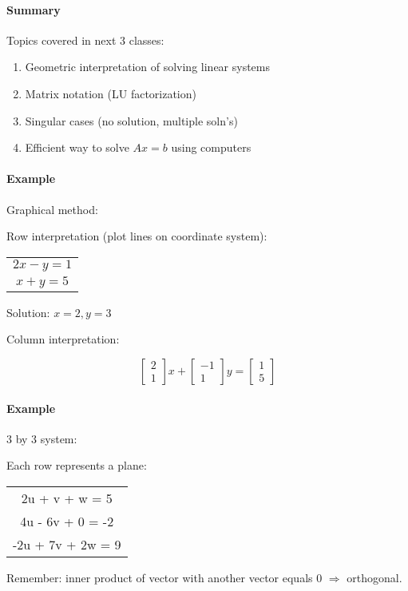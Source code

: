 \documentclass[12pt]{article}
\newcommand{\<}{\langle}
\renewcommand{\>}{\rangle}
\begin{document}
\paragraph{Summary}
Topics covered in next 3 classes:
\begin{enumerate}
	\item Geometric interpretation of solving linear systems
	\item Matrix notation (LU factorization)
	\item Singular cases (no solution, multiple soln's)
	\item Efficient way to solve $Ax=b$ using computers
\end{enumerate}

\paragraph{Example} Graphical method:

Row interpretation (plot lines on coordinate system):

\begin{tabular}{c}
	$2x - y = 1$ \\
	$x + y = 5$
\end{tabular}
Solution: $x=2,y=3$

Column interpretation:

$$ \begin{bmatrix}
	2 \\ 1
\end{bmatrix} x + 
\begin{bmatrix}
	-1 \\ 1
\end{bmatrix} y =
\begin{bmatrix}
	1 \\ 5
\end{bmatrix}$$

\paragraph{Example} 3 by 3 system:

Each row represents a plane:

\begin{tabular}{c}
	2u + v + w = 5 \\
	4u - 6v + 0 = -2 \\
	-2u + 7v + 2w = 9
\end{tabular}

Remember: inner product of vector with another vector equals 0 $\Rightarrow$ orthogonal.
\end{document}
